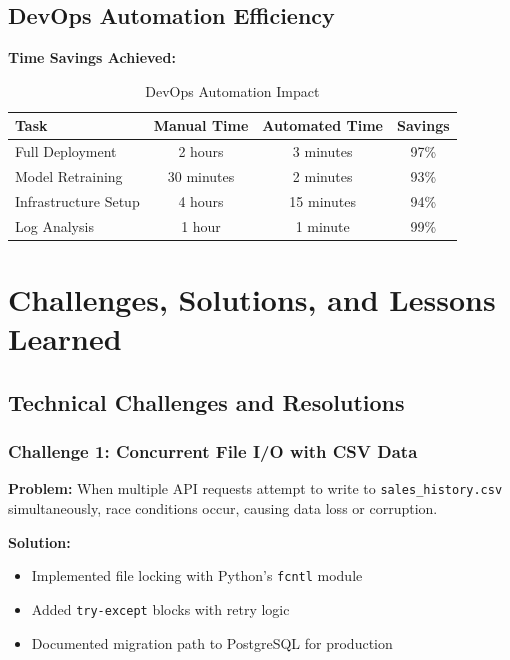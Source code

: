 \documentclass[12pt,a4paper]{report}
\begin{document}
\section{DevOps Automation Efficiency}

\textbf{Time Savings Achieved:}

\begin{table}[H]
    \centering
    \caption{DevOps Automation Impact}
    \begin{tabular}{|l|c|c|c|}
    \hline
    \textbf{Task} & \textbf{Manual Time} & \textbf{Automated Time} & \textbf{Savings} \\
    \hline
    Full Deployment & 2 hours & 3 minutes & 97\% \\
    Model Retraining & 30 minutes & 2 minutes & 93\% \\
    Infrastructure Setup & 4 hours & 15 minutes & 94\% \\
    Log Analysis & 1 hour & 1 minute & 99\% \\
    \hline
    \end{tabular}
\end{table}

\chapter{Challenges, Solutions, and Lessons Learned}

\section{Technical Challenges and Resolutions}

\subsection{Challenge 1: Concurrent File I/O with CSV Data}

\textbf{Problem:} When multiple API requests attempt to write to \texttt{sales\_history.csv} simultaneously, race conditions occur, causing data loss or corruption.

\textbf{Solution:}
\begin{itemize}[leftmargin=2em]
    \item Implemented file locking with Python's \texttt{fcntl} module
    \item Added \texttt{try-except} blocks with retry logic
    \item Documented migration path to PostgreSQL for production
\end{itemize}
\end{document}
